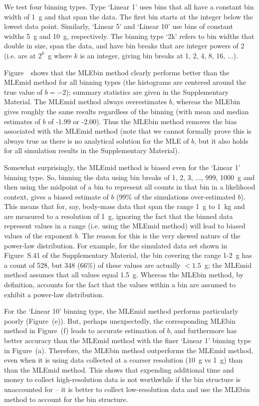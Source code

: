 We test four binning types. Type `Linear 1' uses bins that all
have a constant bin width of 1~g and that span the data. The first bin starts at
the integer below the lowest data point.
Similarly, `Linear 5' and `Linear 10' use bins of constant widths 5~g
and 10~g, respectively. The binning type `2k' refers to bin widths that double in
size, span the data, and have bin breaks that are integer powers of 2 (i.e. are
at $2^k$~g where $k$ is an integer, giving bin breaks at 1, 2, 4, 8, 16, ...).

Figure~\fitMLEhists~shows that the MLEbin method clearly performs better than
the MLEmid method for all binning types (the histograms are centered around the
true value of $b=-2$); summary statistics are given in the Supplementary
Material. The MLEmid method always overestimates $b$, whereas the
MLEbin gives roughly the same results regardless of the binning (with mean and median
estimates of $b$ of -1.99 or -2.00). Thus the MLEbin method removes the bias
associated with the MLEmid method (note that we cannot formally prove this
is always true as there is no analytical solution for the MLE of $b$, but it
also holds for all simulation results in the Supplementary Material).

Somewhat surprisingly, the MLEmid method is biased even for the `Linear 1'
binning type. So, binning the data using bin breaks of 1, 2, 3, ..., 999, 1000~g
and then using the midpoint of a bin to represent all counts in that bin in a
likelihood context, gives a biased estimate of $b$ (99\% of the simulations
over-estimated $b$). This means that for, say, body-mass data that span the
range 1~g to 1~kg and are measured to a resolution of 1~g, ignoring the fact
that the binned data represent values in a range (i.e. using the MLEmid method)
will lead to biased values of the exponent $b$. The reason for this is the very
skewed nature of the power-law distribution. For example,
for the simulated data set
shown in Figure~S.41 of the
Supplementary Material, the
bin covering the range 1-2~g has a count of 528, but 348 (66\%) of these values
are actually $<1.5$~g; the MLEmid method assumes that all values equal
1.5~g. Whereas the MLEbin method, by definition, accounts for the fact that the
values within a bin are assumed to exhibit a power-law distribution.


For the `Linear 10' binning type, the MLEmid method performs particularly poorly
(Figure~\fitMLEhists(e)). But, perhaps unexpectedly, the corresponding MLEbin method in
Figure~\fitMLEhists(f) leads to accurate estimation of $b$, and furthermore has
better accuracy than the MLEmid method with the finer `Linear 1' binning type in
Figure~\fitMLEhists(a).
Therefore, the MLEbin method outperforms the MLEmid method, even when it
is using data collected at a coarser resolution (10~g vs 1~g) than than the MLEmid method.
This shows that expending additional time and money to collect
high-resolution data
is not
worthwhile if the bin structure is unaccounted for -- it is better to collect
low-resolution data and use the MLEbin method to account for the bin structure.

